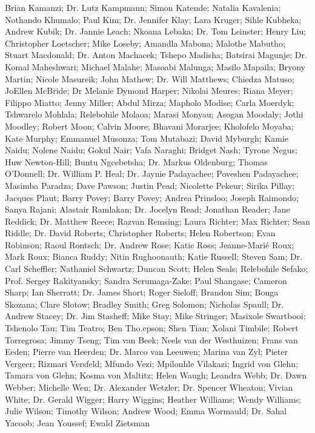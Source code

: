     Brian Kamanzi;
Dr. Lutz Kampmann;
    Simon Katende;
    Natalia Kavalenia;
    Nothando Khumalo;
    Paul Kim;
Dr. Jennifer Klay;
    Lara Kruger;
    Sihle Kubheka;
    Andrew Kubik;
Dr. Jannie Leach;
    Nkoana Lebaka;
Dr. Tom Leinster;
    Henry Liu;
    Christopher Loetscher;
    Mike Loseby;
    Amandla Mabona;
    Malothe Mabutho;
    Stuart Macdonald;
Dr. Anton Machacek;
    Tshepo Madisha;
    Batsirai Magunje;
Dr. Komal Maheshwari;
    Michael Malahe;
    Masoabi Malunga;
    Masilo Mapaila;
    Bryony Martin;
    Nicole Masureik;
    John Mathew;
Dr. Will Matthews;
    Chiedza Matuso;
    JoEllen McBride;
    Dr Melanie Dymond Harper;
    Nikolai Meures;
    Riana Meyer;
    Filippo Miatto;
    Jenny Miller;
    Abdul Mirza;
    Mapholo Modise;
    Carla Moerdyk;
    Tshwarelo Mohlala;
    Relebohile Molaoa;
    Marasi Monyau;
    Asogan Moodaly;
    Jothi Moodley;
    Robert Moon;
    Calvin Moore;
    Bhavani Morarjee;
    Kholofelo Moyaba;
    Kate Murphy;
    Emmanuel Musonza;
    Tom Mutabazi;
    David Myburgh;
    Kamie Naidu;
    Nolene Naidu;
    Gokul Nair;
    Vafa Naraghi;
    Bridget Nash;
    Tyrone Negus;
    Huw Newton-Hill;
    Buntu Ngcebetsha;
Dr. Markus Oldenburg;
    Thomas O’Donnell;
Dr. William P. Heal;
Dr. Jaynie Padayachee;
    Poveshen Padayachee;
    Masimba Paradza;
    Dave Pawson;
    Justin Pead;
    Nicolette Pekeur;
    Sirika Pillay;
    Jacques Plaut;
    Barry Povey;
    Barry Povey;
    Andrea Prinsloo;
    Joseph Raimondo;
    Sanya Rajani;
    Alastair Ramlakan;
Dr. Jocelyn Read;
    Jonathan Reader;
    Jane Reddick;
Dr. Matthew Reece;
    Razvan Remsing;
    Laura Richter;
    Max Richter;
    Sean Riddle;
Dr. David Roberts;
    Christopher Roberts;
    Helen Robertson;
    Evan Robinson;
    Raoul Rontsch;
Dr. Andrew Rose;
    Katie Ross;
    Jeanne-Marié Roux;
    Mark Roux;
    Bianca Ruddy;
    Nitin Rughoonauth;
    Katie Russell;
    Steven Sam;
Dr. Carl Scheffler;
    Nathaniel Schwartz;
    Duncan Scott;
    Helen Seals;
    Relebohile Sefako;
    Prof. Sergey Rakityansky;
    Sandra Serumaga-Zake;
    Paul Shangase;
    Cameron Sharp;
    Ian Sherratt;
Dr. James Short;
    Roger Sieloff;
    Brandon Sim;
    Bonga Skozana;
    Clare Slotow;
    Bradley Smith;
    Greg Solomon;
    Nicholas Spaull;
Dr. Andrew Stacey;
Dr. Jim Stasheff;
    Mike Stay;
    Mike Stringer;
    Masixole Swartbooi;
    Tshenolo Tau;
    Tim Teatro;
    Ben Tho.epson;
    Shen Tian;
    Xolani Timbile;
    Robert Torregrosa;
    Jimmy Tseng;
    Tim van Beek;
    Neels van der Westhuizen;
    Frans van Eeden;
    Pierre van Heerden;
Dr. Marco van Leeuwen;
    Marina van Zyl;
    Pieter Vergeer;
    Rizmari Versfeld;
    Mfundo Vezi;
    Mpilonhle Vilakazi;
    Ingrid von Glehn;
    Tamara von Glehn;
    Kosma von Maltitz;
    Helen Waugh;
    Leandra Webb;
Dr. Dawn Webber;
    Michelle Wen;
Dr. Alexander Wetzler;
Dr. Spencer Wheaton;
    Vivian White;
Dr. Gerald Wigger;
    Harry Wiggins;
    Heather Williams;
    Wendy Williams;
    Julie Wilson;
    Timothy Wilson;
    Andrew Wood;
    Emma Wormauld;
Dr. Sahal Yacoob;
    Jean Youssef;
    Ewald Zietsman 




